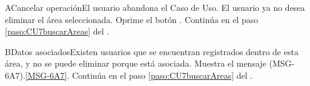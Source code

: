 		\begin{UCtrayectoriaA}{A}{Cancelar operación}{El usuario abandona el Caso de Uso.}
			\UCpaso[\UCactor] El usuario ya no desea eliminar el área seleccionada.
			\UCpaso[\UCactor] Oprime el botón .
			\UCpaso Continúa en el paso \ref{paso:CU7buscarAreas} del .
		\end{UCtrayectoriaA}

		 \begin{UCtrayectoriaA}{B}{Datos asociados}{Existen usuarios que se encuentran registrados dentro de esta área, y no se puede eliminar porque está asociada.}
			\UCpaso Muestra el mensaje (MSG-6A7).\ref{MSG-6A7}.
			\UCpaso Continúa en el paso \ref{paso:CU7buscarAreas} del .
		\end{UCtrayectoriaA}
